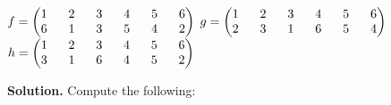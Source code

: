 \documentclass[11pt]{article}
\begin{document}
\begin{enumerate}
	$f = \begin{pmatrix}
		1 \hspace{6mm} 2 \hspace{6mm} 3 \hspace{6mm} 4 \hspace{6mm} 5 \hspace{6mm} 6 \\
		6 \hspace{6mm} 1 \hspace{6mm} 3 \hspace{6mm} 5 \hspace{6mm} 4 \hspace{6mm} 2
	\end{pmatrix}$
	$g = \begin{pmatrix}
		1 \hspace{6mm} 2 \hspace{6mm} 3 \hspace{6mm} 4 \hspace{6mm} 5 \hspace{6mm} 6 \\
		2 \hspace{6mm} 3 \hspace{6mm} 1 \hspace{6mm} 6 \hspace{6mm} 5 \hspace{6mm} 4
	\end{pmatrix}$ \\
	$h = \begin{pmatrix}
		1 \hspace{6mm} 2 \hspace{6mm} 3 \hspace{6mm} 4 \hspace{6mm} 5 \hspace{6mm} 6 \\
		3 \hspace{6mm} 1 \hspace{6mm} 6 \hspace{6mm} 4 \hspace{6mm} 5 \hspace{6mm} 2
	\end{pmatrix}$
  
	{\bfseries Solution.} Compute the following:
	

\end{enumerate}
\end{document}
